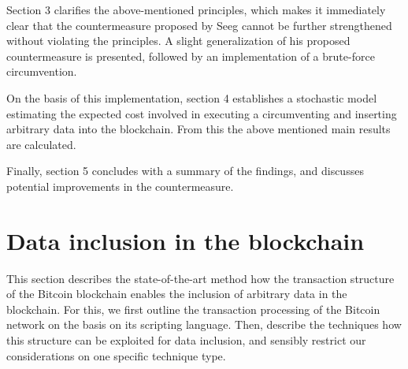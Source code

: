 \documentclass[a4paper,11pt,titlepage]{scrbook}
\begin{document}
Section 3 clarifies the above-mentioned principles, which makes it immediately clear that the countermeasure proposed by Seeg cannot be further strengthened without violating the principles.
A slight generalization of his proposed countermeasure is presented, followed by an implementation of a brute-force circumvention.

On the basis of this implementation, section 4 establishes a stochastic model estimating the expected cost involved in executing a circumventing and inserting arbitrary data into the blockchain.
From this the above mentioned main results are calculated.

Finally, section 5 concludes with a summary of the findings, and discusses potential improvements in the countermeasure.









\chapter{Data inclusion in the blockchain}

This section describes the state-of-the-art method how the transaction structure of the Bitcoin blockchain enables the inclusion of arbitrary data in the blockchain.
For this, we first outline the transaction processing of the Bitcoin network on the basis on its scripting language. Then, describe the techniques how this structure can be exploited for data inclusion, and sensibly restrict our considerations on one specific technique type.
\end{document}
